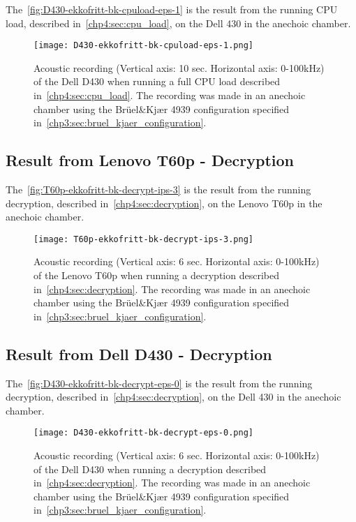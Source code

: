 The~\autoref{fig:D430-ekkofritt-bk-cpuload-eps-1} is the result from the running CPU load, described in~\autoref{chp4:sec:cpu_load}, on the Dell 430 in the anechoic chamber. 
\begin{figure}[ht]
    \centering
    \texttt{[image: D430-ekkofritt-bk-cpuload-eps-1.png]}
    \caption{Acoustic recording (Vertical axis: 10 sec. Horizontal axis: 0-100kHz) of the Dell D430 when running a full CPU load described in~\autoref{chp4:sec:cpu_load}. The recording was made in an anechoic chamber using the Brüel\&Kjær 4939 configuration specified in~\autoref{chp3:sec:bruel_kjaer_configuration}. }
    \label{fig:D430-ekkofritt-bk-cpuload-eps-1}
\end{figure}


\subsection{Result from Lenovo T60p - Decryption}\label{chp5:subsec:t60p_bk_results_decryption}

The~\autoref{fig:T60p-ekkofritt-bk-decrypt-ips-3} is the result from the running decryption, described in~\autoref{chp4:sec:decryption}, on the Lenovo T60p in the anechoic chamber. 
\begin{figure}[ht]
    \centering
    \texttt{[image: T60p-ekkofritt-bk-decrypt-ips-3.png]}
    \caption{Acoustic recording (Vertical axis: 6 sec. Horizontal axis: 0-100kHz) of the Lenovo T60p when running a decryption described in~\autoref{chp4:sec:decryption}. The recording was made in an anechoic chamber using the Brüel\&Kjær 4939 configuration specified in~\autoref{chp3:sec:bruel_kjaer_configuration}. }
    \label{fig:T60p-ekkofritt-bk-decrypt-ips-3}
\end{figure}

\subsection{Result from Dell D430 - Decryption}\label{chp5:subsec:d430_bk_results_cpuload}

The~\autoref{fig:D430-ekkofritt-bk-decrypt-eps-0} is the result from the running decryption, described in~\autoref{chp4:sec:decryption}, on the Dell 430 in the anechoic chamber. 
\begin{figure}[ht]
    \centering
    \texttt{[image: D430-ekkofritt-bk-decrypt-eps-0.png]}
    \caption{Acoustic recording (Vertical axis: 6 sec. Horizontal axis: 0-100kHz) of the Dell D430 when running a decryption described in~\autoref{chp4:sec:decryption}. The recording was made in an anechoic chamber using the Brüel\&Kjær 4939 configuration specified in~\autoref{chp3:sec:bruel_kjaer_configuration}.}
    \label{fig:D430-ekkofritt-bk-decrypt-eps-0}
\end{figure}


